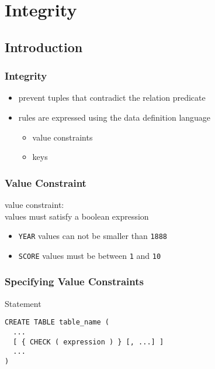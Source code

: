 \documentclass[dvipsnames]{beamer}
\theoremstyle{plain}
\begin{document}
\section{Integrity}

\subsection{Introduction}

\begin{frame}
  \frametitle{Integrity}

  \begin{itemize}
    \item prevent tuples that contradict the relation predicate

    \pause
    \bigskip
    \item rules are expressed using the data definition language
    \begin{itemize}
      \item value constraints
      \item keys
    \end{itemize}
  \end{itemize}
\end{frame}

\begin{frame}
  \frametitle{Value Constraint}

  \begin{definition}
    \alert{value constraint}:\\
      values must satisfy a boolean expression
  \end{definition}

  \pause
  \begin{example}
    \begin{itemize}
      \item \texttt{YEAR} values can not be smaller than \texttt{1888}
      \item \texttt{SCORE} values must be between \texttt{1} and \texttt{10}
    \end{itemize}
  \end{example}
\end{frame}

\begin{frame}[fragile]
  \frametitle{Specifying Value Constraints}

  \begin{block}{Statement}
    \begin{lstlisting}
CREATE TABLE table_name (
  ...
  [ { CHECK ( expression ) } [, ...] ]
  ...
)
    \end{lstlisting}
  \end{block}
\end{frame}
\end{document}
